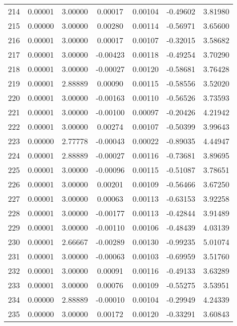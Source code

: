\begin{longtable}{c c c c c c c}
214 &  0.00001 &      3.00000 &  0.00017 &   0.00104 &  -0.49602 &   3.81980 \\
215 &  0.00000 &      3.00000 &  0.00280 &   0.00114 &  -0.56971 &   3.65600 \\
216 &  0.00001 &      3.00000 &  0.00017 &   0.00107 &  -0.32015 &   3.58682 \\
217 &  0.00001 &      3.00000 & -0.00423 &   0.00118 &  -0.49254 &   3.70290 \\
218 &  0.00001 &      3.00000 & -0.00027 &   0.00120 &  -0.58681 &   3.76428 \\
219 &  0.00001 &      2.88889 &  0.00090 &   0.00115 &  -0.58556 &   3.52020 \\
220 &  0.00001 &      3.00000 & -0.00163 &   0.00110 &  -0.56526 &   3.73593 \\
221 &  0.00001 &      3.00000 & -0.00100 &   0.00097 &  -0.20426 &   4.21942 \\
222 &  0.00001 &      3.00000 &  0.00274 &   0.00107 &  -0.50399 &   3.99643 \\
223 &  0.00000 &      2.77778 & -0.00043 &   0.00022 &  -0.89035 &   4.44947 \\
224 &  0.00001 &      2.88889 & -0.00027 &   0.00116 &  -0.73681 &   3.89695 \\
225 &  0.00001 &      3.00000 & -0.00096 &   0.00115 &  -0.51087 &   3.78651 \\
226 &  0.00001 &      3.00000 &  0.00201 &   0.00109 &  -0.56466 &   3.67250 \\
227 &  0.00001 &      3.00000 &  0.00063 &   0.00113 &  -0.63153 &   3.92258 \\
228 &  0.00001 &      3.00000 & -0.00177 &   0.00113 &  -0.42844 &   3.91489 \\
229 &  0.00001 &      3.00000 & -0.00110 &   0.00106 &  -0.48439 &   4.03139 \\
230 &  0.00001 &      2.66667 & -0.00289 &   0.00130 &  -0.99235 &   5.01074 \\
231 &  0.00001 &      3.00000 & -0.00063 &   0.00103 &  -0.69959 &   3.51760 \\
232 &  0.00001 &      3.00000 &  0.00091 &   0.00116 &  -0.49133 &   3.63289 \\
233 &  0.00001 &      3.00000 &  0.00076 &   0.00109 &  -0.55275 &   3.53951 \\
234 &  0.00000 &      2.88889 & -0.00010 &   0.00104 &  -0.29949 &   4.24339 \\
235 &  0.00000 &      3.00000 &  0.00172 &   0.00120 &  -0.33291 &   3.60843 \\

\end{longtable}
